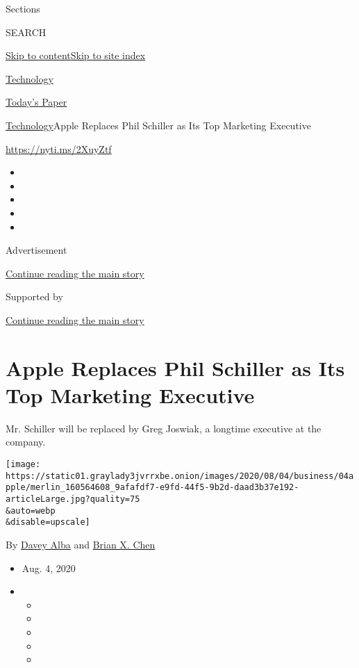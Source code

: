 Sections

SEARCH

\protect\hyperlink{site-content}{Skip to
content}\protect\hyperlink{site-index}{Skip to site index}

\href{https://www.nytimes3xbfgragh.onion/section/technology}{Technology}

\href{https://myaccount.nytimes3xbfgragh.onion/auth/login?response_type=cookie\&client_id=vi}{}

\href{https://www.nytimes3xbfgragh.onion/section/todayspaper}{Today's
Paper}

\href{/section/technology}{Technology}\textbar{}Apple Replaces Phil
Schiller as Its Top Marketing Executive

\href{https://nyti.ms/2XuyZtf}{https://nyti.ms/2XuyZtf}

\begin{itemize}
\item
\item
\item
\item
\item
\end{itemize}

Advertisement

\protect\hyperlink{after-top}{Continue reading the main story}

Supported by

\protect\hyperlink{after-sponsor}{Continue reading the main story}

\hypertarget{apple-replaces-phil-schiller-as-its-top-marketing-executive}{%
\section{Apple Replaces Phil Schiller as Its Top Marketing
Executive}\label{apple-replaces-phil-schiller-as-its-top-marketing-executive}}

Mr. Schiller will be replaced by Greg Joswiak, a longtime executive at
the company.

\texttt{[image: https://static01.graylady3jvrrxbe.onion/images/2020/08/04/business/04apple/merlin\_160564608\_9afafdf7-e9fd-44f5-9b2d-daad3b37e192-articleLarge.jpg?quality=75\\\&auto=webp\\\&disable=upscale]}

By \href{https://www.nytimes3xbfgragh.onion/by/davey-alba}{Davey Alba}
and \href{https://www.nytimes3xbfgragh.onion/by/brian-x-chen}{Brian X.
Chen}

\begin{itemize}
\item
  Aug. 4, 2020
\item
  \begin{itemize}
  \item
  \item
  \item
  \item
  \item
  \end{itemize}
\end{itemize}

